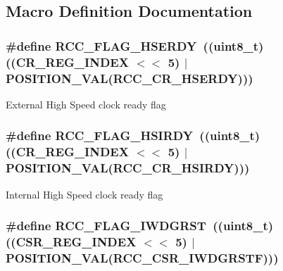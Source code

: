 \subsection{Macro Definition Documentation}
\hypertarget{group___r_c_c___flag_ga173edf47bec93cf269a0e8d0fec9997c}{
\subsubsection[{R\-C\-C\-\_\-\-F\-L\-A\-G\-\_\-\-H\-S\-E\-R\-D\-Y}]{\setlength{\rightskip}{0pt plus 5cm}\#define R\-C\-C\-\_\-\-F\-L\-A\-G\-\_\-\-H\-S\-E\-R\-D\-Y~((uint8\-\_\-t)((C\-R\-\_\-\-R\-E\-G\-\_\-\-I\-N\-D\-E\-X $<$$<$ 5) $\vert$ P\-O\-S\-I\-T\-I\-O\-N\-\_\-\-V\-A\-L({\bf R\-C\-C\-\_\-\-C\-R\-\_\-\-H\-S\-E\-R\-D\-Y})))}}\label{group___r_c_c___flag_ga173edf47bec93cf269a0e8d0fec9997c}
External High Speed clock ready flag \hypertarget{group___r_c_c___flag_ga827d986723e7ce652fa733bb8184d216}{
\subsubsection[{R\-C\-C\-\_\-\-F\-L\-A\-G\-\_\-\-H\-S\-I\-R\-D\-Y}]{\setlength{\rightskip}{0pt plus 5cm}\#define R\-C\-C\-\_\-\-F\-L\-A\-G\-\_\-\-H\-S\-I\-R\-D\-Y~((uint8\-\_\-t)((C\-R\-\_\-\-R\-E\-G\-\_\-\-I\-N\-D\-E\-X $<$$<$ 5) $\vert$ P\-O\-S\-I\-T\-I\-O\-N\-\_\-\-V\-A\-L({\bf R\-C\-C\-\_\-\-C\-R\-\_\-\-H\-S\-I\-R\-D\-Y})))}}\label{group___r_c_c___flag_ga827d986723e7ce652fa733bb8184d216}
Internal High Speed clock ready flag \hypertarget{group___r_c_c___flag_gaac46bac8a97cf16635ff7ffc1e6c657f}{
\subsubsection[{R\-C\-C\-\_\-\-F\-L\-A\-G\-\_\-\-I\-W\-D\-G\-R\-S\-T}]{\setlength{\rightskip}{0pt plus 5cm}\#define R\-C\-C\-\_\-\-F\-L\-A\-G\-\_\-\-I\-W\-D\-G\-R\-S\-T~((uint8\-\_\-t)((C\-S\-R\-\_\-\-R\-E\-G\-\_\-\-I\-N\-D\-E\-X $<$$<$ 5) $\vert$ P\-O\-S\-I\-T\-I\-O\-N\-\_\-\-V\-A\-L({\bf R\-C\-C\-\_\-\-C\-S\-R\-\_\-\-I\-W\-D\-G\-R\-S\-T\-F})))}}\label{group___r_c_c___flag_gaac46bac8a97cf16635ff7ffc1e6c657f}
